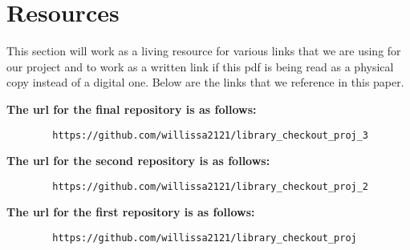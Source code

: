 \documentclass{article}
\begin{document}
	\section{Resources}
	
	This section will work as a living resource for various links that we are using for our project and to work as a written link if this pdf is being read as a physical copy instead of a digital one. Below are the links that we reference in this paper.
	
	\textbf{The url for the final repository is as follows:}
	\begin{verbatim}
		https://github.com/willissa2121/library_checkout_proj_3
	\end{verbatim}
	\textbf{The url for the second repository is as follows:}
	\begin{verbatim}
		https://github.com/willissa2121/library_checkout_proj_2
	\end{verbatim}
	\textbf{The url for the first repository is as follows:}
	\begin{verbatim}
		https://github.com/willissa2121/library_checkout_proj
	\end{verbatim}
	
\end{document}
